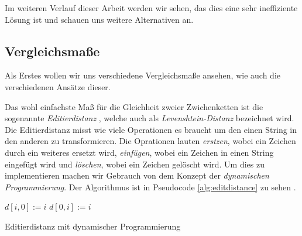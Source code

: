\documentclass[sigconf]{acmart}
\DeclarePairedDelimiter\abs{\lvert}{\rvert}
\begin{document}
Im weiteren Verlauf dieser Arbeit werden wir sehen, das dies eine sehr
ineffiziente Lösung ist und schauen uns weitere Alternativen an.


\subsection*{Vergleichsmaße}
Als Erstes wollen wir uns verschiedene Vergleichsmaße ansehen, wie auch
die verschiedenen Ansätze dieser.

Das wohl einfachste Maß für die Gleichheit zweier Zwichenketten
ist die sogenannte \emph{Editierdistanz} \cite[Vgl. S. 2] {cohen2003comparison}, welche auch als
\emph{Levenshtein-Distanz} bezeichnet wird. Die Editierdistanz
misst wie viele Operationen es braucht um den einen String in den 
anderen zu transformieren. Die Oprationen lauten \emph{erstzen}, wobei
ein Zeichen durch ein weiteres ersetzt wird, \emph{einfügen}, wobei ein
Zeichen in einen String eingefügt wird und \emph{löschen}, wobei ein 
Zeichen gelöscht wird. Um dies zu implementieren machen wir Gebrauch
von dem Konzept der \emph{dynamischen Programmierung}. Der Algorithmus ist
in Pseudocode \ref{alg:editdistance} zu sehen \cite[Vgl. S. 223] {bille2005survey}.


  \begin{algorithm}
    \begin{algorithmic}[1]
      
        \State $d[i,0] := i$
      \EndFor
        \State $d[0,i] := i$
      \EndFor

          \Else
          \EndIf
          \State {}
        \EndFor
      \EndFor
    
      \EndProcedure
      
    \end{algorithmic}
    \caption{Editierdistanz mit dynamischer Programmierung}
    \label{alg:editdistance}
    \end{algorithm}
\end{document}
